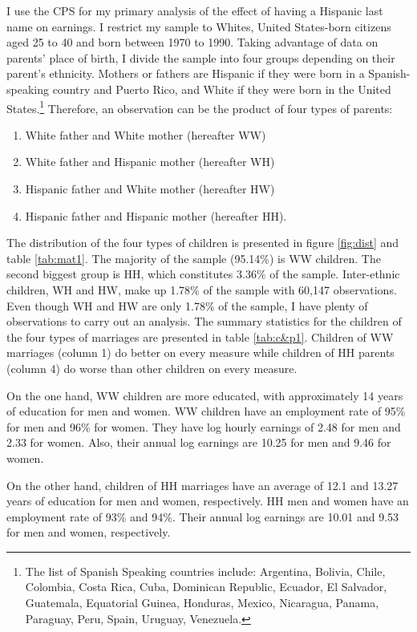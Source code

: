 \documentclass{wptemp}
\begin{document}
I use the CPS for my primary analysis of the effect of having a Hispanic last name on earnings. I restrict my sample to Whites, United States-born citizens aged 25 to 40 and born between 1970 to 1990. Taking advantage of data on parents' place of birth, I divide the sample into four groups depending on their parent's ethnicity. Mothers or fathers are Hispanic if they were born in a Spanish-speaking country and Puerto Rico, and White if they were born in the United States.\footnote{The list of Spanish Speaking countries include: Argentina, Bolivia, Chile, Colombia, Costa Rica, Cuba, Dominican Republic, Ecuador, El Salvador, Guatemala, Equatorial Guinea, Honduras, Mexico, Nicaragua, Panama, Paraguay, Peru, Spain, Uruguay, Venezuela.} Therefore, an observation can be the product of four types of parents: 
\begin{enumerate}
\item White father and White mother (hereafter WW) 
\item White father and Hispanic mother (hereafter WH)
\item Hispanic father and White mother (hereafter HW)
\item Hispanic father and Hispanic mother (hereafter HH).
\end{enumerate}

The distribution of the four types of children is presented in figure \ref{fig:dist} and table \ref{tab:mat1}. The majority of the sample (95.14\%) is WW children. The second biggest group is HH, which constitutes 3.36\% of the sample. Inter-ethnic children, WH and HW, make up 1.78\% of the sample with 60,147 observations. Even though WH and HW are only 1.78\% of the sample, I have plenty of observations to carry out an analysis. The summary statistics for the children of the four types of marriages are presented in table \ref{tab:c&p1}. Children of WW marriages (column 1) do better on every measure while children of HH parents (column 4) do worse than other children on every measure. 


On the one hand, WW children are more educated, with approximately 14 years of education for men and women. WW children have an employment rate of 95\% for men and 96\% for women. They have log hourly earnings of 2.48 for men and 2.33 for women. Also, their annual log earnings are 10.25 for men and 9.46 for women.

On the other hand, children of HH marriages have an average of 12.1 and 13.27 years of education for men and women, respectively. HH men and women have an employment rate of 93\% and 94\%. Their annual log earnings are 10.01 and 9.53 for men and women, respectively. 
\end{document}
